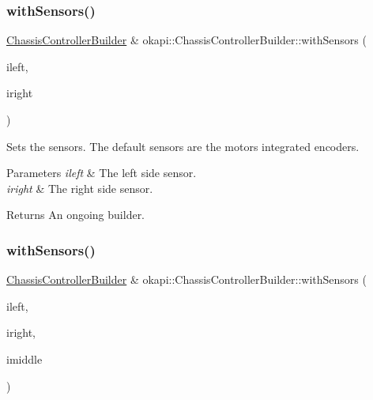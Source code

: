 \subsubsection{\texorpdfstring{withSensors()}{withSensors()}\hspace{0.1cm}{\footnotesize\ttfamily [3/6]}}
{\footnotesize\ttfamily \mbox{\hyperlink{classokapi_1_1ChassisControllerBuilder}{Chassis\+Controller\+Builder}} \& okapi\+::\+Chassis\+Controller\+Builder\+::with\+Sensors (\begin{DoxyParamCaption}\item[{const \mbox{\hyperlink{classokapi_1_1IntegratedEncoder}{Integrated\+Encoder}} \&}]{ileft,  }\item[{const \mbox{\hyperlink{classokapi_1_1IntegratedEncoder}{Integrated\+Encoder}} \&}]{iright }\end{DoxyParamCaption})}

Sets the sensors. The default sensors are the motor\textquotesingle{}s integrated encoders.


\begin{DoxyParams}{Parameters}
{\em ileft} & The left side sensor. \\
\hline
{\em iright} & The right side sensor. \\
\hline
\end{DoxyParams}
\begin{DoxyReturn}{Returns}
An ongoing builder. 
\end{DoxyReturn}
\mbox{\label{classokapi_1_1ChassisControllerBuilder_a9ba0a2bf4c4d0334f96bd08b08144cc3}} 
\subsubsection{\texorpdfstring{withSensors()}{withSensors()}\hspace{0.1cm}{\footnotesize\ttfamily [4/6]}}
{\footnotesize\ttfamily \mbox{\hyperlink{classokapi_1_1ChassisControllerBuilder}{Chassis\+Controller\+Builder}} \& okapi\+::\+Chassis\+Controller\+Builder\+::with\+Sensors (\begin{DoxyParamCaption}\item[{const \mbox{\hyperlink{classokapi_1_1IntegratedEncoder}{Integrated\+Encoder}} \&}]{ileft,  }\item[{const \mbox{\hyperlink{classokapi_1_1IntegratedEncoder}{Integrated\+Encoder}} \&}]{iright,  }\item[{const \mbox{\hyperlink{classokapi_1_1ADIEncoder}{A\+D\+I\+Encoder}} \&}]{imiddle }\end{DoxyParamCaption})}

